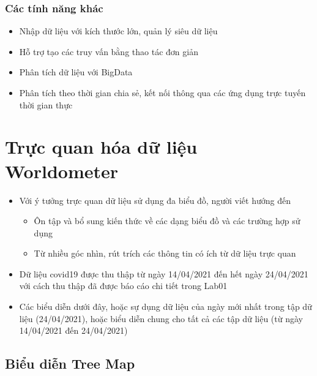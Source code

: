 \documentclass[a4paper, 12pt]{article}
\begin{document}
\subsubsection{Các tính năng khác}

\begin{itemize}
    \item Nhập dữ liệu với kích thước lớn, quản lý siêu dữ liệu
    \item Hỗ trợ tạo các truy vấn bằng thao tác đơn giản
    \item Phân tích dữ liệu với BigData
    \item Phân tích theo thời gian chia sẻ, kết nối thông qua các ứng dụng trực tuyến thời gian thực
\end{itemize}

\clearpage

\section{Trực quan hóa dữ liệu Worldometer}

\begin{itemize}
    \item Với ý tưởng trực quan dữ liệu sử dụng đa biểu đồ, người viết hướng đến
    \begin{itemize}
        \item Ôn tập và bổ sung kiến thức về các dạng biểu đồ và các trường hợp sử dụng
        \item Từ nhiều góc nhìn, rút trích các thông tin có ích từ dữ liệu trực quan
    \end{itemize}

    \item Dữ liệu covid19 được thu thập từ ngày 14/04/2021 đến hết ngày 24/04/2021 với cách thu thập đã được báo cáo chi tiết trong Lab01
    \item Các biểu diễn dưới đây, hoặc sự dụng dữ liệu của ngày mới nhất trong tập dữ liệu (24/04/2021), hoặc biểu diễn chung cho tất cả các tập dữ liệu (từ ngày 14/04/2021 đến 24/04/2021)
\end{itemize}

\subsection{Biểu diễn Tree Map}
\end{document}
